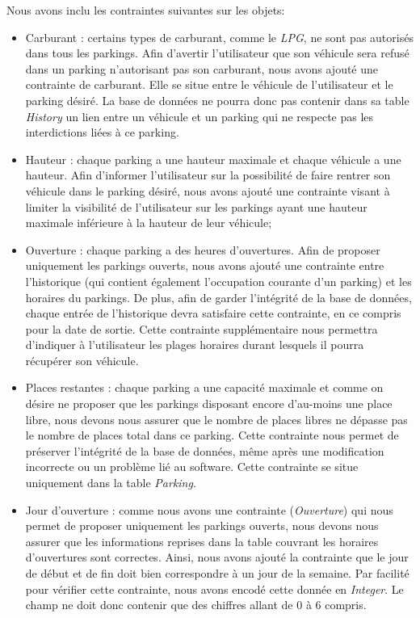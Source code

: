 \documentclass[a4paper,11pt]{article}
\begin{document}
Nous avons inclu les contraintes suivantes sur les objets:
\begin{itemize}
	\item Carburant : certains types de carburant, comme le \emph{LPG}, ne sont pas autorisés dans tous les parkings.  Afin d'avertir l'utilisateur que son véhicule sera refusé dans un parking n'autorisant pas son carburant, nous avons ajouté une contrainte de carburant.  Elle se situe entre le véhicule de l'utilisateur et le parking désiré. La base de données ne pourra donc pas contenir dans sa table \textit{History} un lien entre un véhicule et un parking qui ne respecte pas les interdictions liées à ce parking.
    \item Hauteur : chaque parking a une hauteur maximale et chaque véhicule a une hauteur.  Afin d'informer l'utilisateur sur la possibilité de faire rentrer son véhicule dans le parking désiré, nous avons ajouté une contrainte visant à limiter la visibilité de l'utilisateur sur les parkings ayant une hauteur maximale inférieure à la hauteur de leur véhicule;
    \item Ouverture : chaque parking a des heures d'ouvertures.  Afin de proposer uniquement les parkings ouverts, nous avons ajouté une contrainte entre l'historique (qui contient également l'occupation courante d'un parking) et les horaires du parkings.  De plus, afin de garder l'intégrité de la base de données, chaque entrée de l'historique devra satisfaire cette contrainte, en ce compris pour la date de sortie.  Cette contrainte supplémentaire nous permettra d'indiquer à l'utilisateur les plages horaires durant lesquels il pourra récupérer son véhicule.
    \item Places restantes : chaque parking a une capacité maximale et comme on désire ne proposer que les parkings disposant encore d'au-moins une place libre, nous devons nous assurer que le nombre de places libres ne dépasse pas le nombre de places total dans ce parking.  Cette contrainte nous permet de préserver l'intégrité de la base de données, même après une modification incorrecte ou un problème lié au software.  Cette contrainte se situe uniquement dans la table \textit{Parking}.
    \item Jour d'ouverture : comme nous avons une contrainte (\emph{Ouverture}) qui nous permet de proposer uniquement les parkings ouverts, nous devons nous assurer que les informations reprises dans la table couvrant les horaires d'ouvertures sont correctes.  Ainsi, nous avons ajouté la contrainte que le jour de début et de fin doit bien correspondre à un jour de la semaine.  Par facilité pour vérifier cette contrainte, nous avons encodé cette donnée en \textit{Integer}.  Le champ ne doit donc contenir que des chiffres allant de 0 à 6 compris.
\end{itemize}
\end{document}
